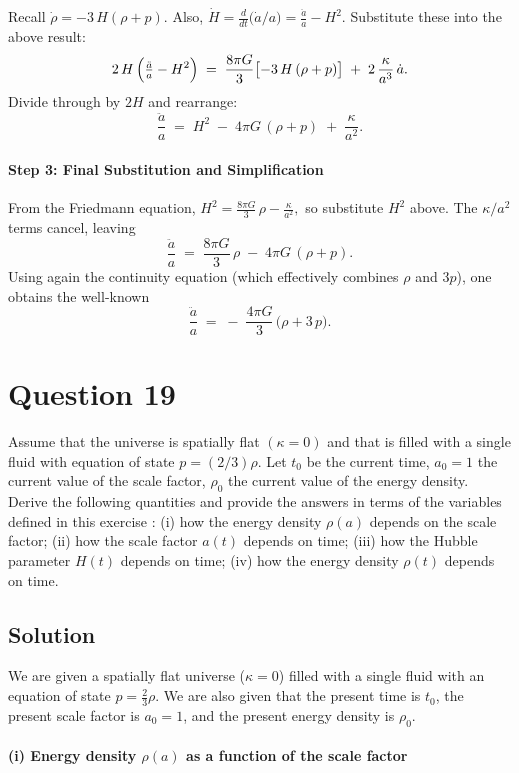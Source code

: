 \documentclass{article}
\begin{document}
Recall
\(\dot{\rho} = -3\,H(\rho + p)\).
Also,
\(\dot{H} = \tfrac{d}{dt}\!\bigl(\dot{a}/a\bigr)
= \tfrac{\ddot{a}}{a} - H^2.\)
Substitute these into the above result:
\[
2\,H\,\Bigl(\tfrac{\ddot{a}}{a}-H^2\Bigr)
\;=\;
\frac{8\pi G}{3}\bigl[-3\,H\,(\rho+p)\bigr]
\;+\;
2\,\frac{\kappa}{a^3}\,\dot{a}.
\]
Divide through by \(2H\) and rearrange:
\[
\frac{\ddot{a}}{a}
\;=\;
H^2
\;-\;
4\pi G\,(\rho+p)
\;+\;
\frac{\kappa}{a^2}.
\]

\paragraph{Step 3: Final Substitution and Simplification}
From the Friedmann equation,
\(
H^2
= \tfrac{8\pi G}{3}\,\rho - \tfrac{\kappa}{a^2},
\)
so substitute \(H^2\) above.  The \(\kappa/a^2\) terms cancel, leaving
\[
\frac{\ddot{a}}{a}
\;=\;
\frac{8\pi G}{3}\,\rho
\;-\;
4\pi G\,(\rho + p).
\]
Using again the continuity equation (which effectively combines \(\rho\) and \(3p\)), one obtains the well-known
\[
\boxed{
\frac{\ddot{a}}{a}
\;=\;
-\;\frac{4\pi G}{3}\,\bigl(\rho + 3\,p\bigr).
}
\]

\pagebreak

\section*{Question 19}
Assume that the universe is spatially flat $(\kappa=0)$ and that is filled with a single fluid with equation of state $p=(2 / 3) \rho$. Let $t_{0}$ be the current time, $a_{0}=1$ the current value of the scale factor, $\rho_{0}$ the current value of the energy density. Derive the following quantities and provide the answers in terms of the variables defined in this exercise : (i) how the energy density $\rho(a)$ depends on the scale factor; (ii) how the scale factor $a(t)$ depends on time; (iii) how the Hubble parameter $H(t)$ depends on time; (iv) how the energy density $\rho(t)$ depends on time.

\subsection*{Solution}

We are given a spatially flat universe ($\kappa = 0$) filled with a single fluid with an equation of state $p = \frac{2}{3}\rho$. We are also given that the present time is $t_0$, the present scale factor is $a_0 = 1$, and the present energy density is $\rho_0$.

\paragraph{(i) Energy density $\rho(a)$ as a function of the scale factor}
\end{document}
